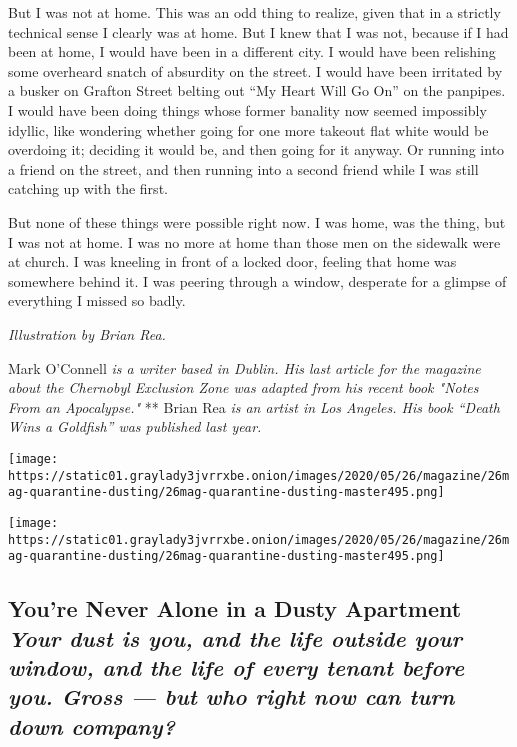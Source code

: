 But I was not at home. This was an odd thing to realize, given that in a
strictly technical sense I clearly was at home. But I knew that I was
not, because if I had been at home, I would have been in a different
city. I would have been relishing some overheard snatch of absurdity on
the street. I would have been irritated by a busker on Grafton Street
belting out ``My Heart Will Go On'' on the panpipes. I would have been
doing things whose former banality now seemed impossibly idyllic, like
wondering whether going for one more takeout flat white would be
overdoing it; deciding it would be, and then going for it anyway. Or
running into a friend on the street, and then running into a second
friend while I was still catching up with the first.

But none of these things were possible right now. I was home, was the
thing, but I was not at home. I was no more at home than those men on
the sidewalk were at church. I was kneeling in front of a locked door,
feeling that home was somewhere behind it. I was peering through a
window, desperate for a glimpse of everything I missed so badly.

\emph{Illustration by Brian Rea.}

Mark O'Connell \emph{is a writer based in Dublin. His last article for
the magazine about the Chernobyl Exclusion Zone was adapted from his
recent book "Notes From an Apocalypse."} ** Brian Rea \emph{is an artist
in Los Angeles. His book ``Death Wins a Goldfish'' was published last
year.}

\texttt{[image: https://static01.graylady3jvrrxbe.onion/images/2020/05/26/magazine/26mag-quarantine-dusting/26mag-quarantine-dusting-master495.png]}

\texttt{[image: https://static01.graylady3jvrrxbe.onion/images/2020/05/26/magazine/26mag-quarantine-dusting/26mag-quarantine-dusting-master495.png]}

\hypertarget{youre-never-alone-in-a-dusty-apartment-your-dust-is-you-and-the-life-outside-your-window-and-the-life-of-every-tenant-before-you-gross--but-who-right-now-can-turn-down-company}{%
\subsection{\texorpdfstring{You're Never Alone in a Dusty Apartment
\emph{Your dust is you, and the life outside your window, and the life
of every tenant before you. Gross --- but who right now can turn down
company?}}{You're Never Alone in a Dusty Apartment Your dust is you, and the life outside your window, and the life of every tenant before you. Gross --- but who right now can turn down company?}}\label{youre-never-alone-in-a-dusty-apartment-your-dust-is-you-and-the-life-outside-your-window-and-the-life-of-every-tenant-before-you-gross--but-who-right-now-can-turn-down-company}}

